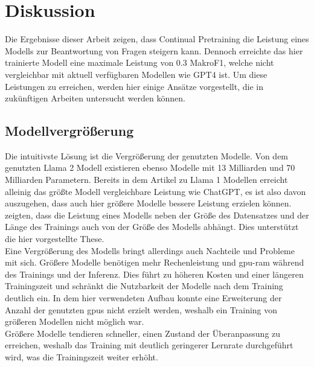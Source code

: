 \chapter{Diskussion}\label{ch:discussion}

Die Ergebnisse dieser Arbeit zeigen, dass Continual Pretraining die Leistung eines Modells zur Beantwortung von Fragen steigern kann.
Dennoch erreichte das hier trainierte Modell eine maximale Leistung von \num{0.3} MakroF1, welche nicht vergleichbar mit aktuell verfügbaren Modellen
wie GPT4 ist.
Um diese Leistungen zu erreichen, werden hier einige Ansätze vorgestellt, die in zukünftigen Arbeiten untersucht werden können.

\section{Modellvergrößerung}
Die intuitivste Lösung ist die Vergrößerung der genutzten Modelle.
Von dem genutzten Llama 2 Modell existieren ebenso Modelle mit 13 Milliarden und 70 Milliarden Parametern.
Bereits in dem Artikel \citet{llama} zu Llama 1 Modellen erreicht alleinig das größte Modell vergleichbare Leistung wie ChatGPT, es ist also davon auszugehen, dass
auch hier größere Modelle bessere Leistung erzielen können.
\citet{scaling_laws} zeigten, dass die Leistung eines Modells neben der Größe des Datensatzes und der Länge des Trainings auch von der Größe des Modells abhängt.
Dies unterstützt die hier vorgestellte These.\\

Eine Vergrößerung des Modells bringt allerdings auch Nachteile und Probleme mit sich.
Größere Modelle benötigen mehr Rechenleistung und \ac{gpu}-\ac{ram} während des Trainings und der Inferenz.
Dies führt zu höheren Kosten und einer längeren Trainingszeit
und schränkt die Nutzbarkeit der Modelle nach dem Training deutlich ein.
In dem hier verwendeten Aufbau konnte eine Erweiterung der Anzahl der genutzten \acp{gpu} nicht erzielt werden,
weshalb ein Training von größeren Modellen nicht möglich war.\\

Größere Modelle tendieren schneller, einen Zustand der Überanpassung zu erreichen, weshalb das Training mit deutlich geringerer Lernrate durchgeführt wird, was die Trainingszeit
weiter erhöht.\\

